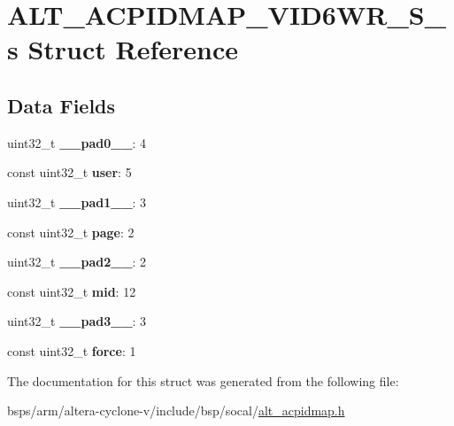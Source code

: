 \hypertarget{structALT__ACPIDMAP__VID6WR__S__s}{}\section{A\+L\+T\+\_\+\+A\+C\+P\+I\+D\+M\+A\+P\+\_\+\+V\+I\+D6\+W\+R\+\_\+\+S\+\_\+s Struct Reference}
\label{structALT__ACPIDMAP__VID6WR__S__s}
\subsection*{Data Fields}
\begin{DoxyCompactItemize}
\item 
\mbox{\label{structALT__ACPIDMAP__VID6WR__S__s_afab267fde5b2c5bf7ffd89e182315f51}} 
uint32\+\_\+t {\bfseries \+\_\+\+\_\+pad0\+\_\+\+\_\+}\+: 4
\item 
\mbox{\label{structALT__ACPIDMAP__VID6WR__S__s_aa2c3d3a2f70354921765c8b9dab77fd8}} 
const uint32\+\_\+t {\bfseries user}\+: 5
\item 
\mbox{\label{structALT__ACPIDMAP__VID6WR__S__s_a72409c911c53802609c1d1eeaebdd679}} 
uint32\+\_\+t {\bfseries \+\_\+\+\_\+pad1\+\_\+\+\_\+}\+: 3
\item 
\mbox{\label{structALT__ACPIDMAP__VID6WR__S__s_a7d7de95e0efbd889ed3995d26557bd08}} 
const uint32\+\_\+t {\bfseries page}\+: 2
\item 
\mbox{\label{structALT__ACPIDMAP__VID6WR__S__s_a3336266330f4afca6c0c679a93951d07}} 
uint32\+\_\+t {\bfseries \+\_\+\+\_\+pad2\+\_\+\+\_\+}\+: 2
\item 
\mbox{\label{structALT__ACPIDMAP__VID6WR__S__s_a568b756c667a152fdb4daf9c3b988a16}} 
const uint32\+\_\+t {\bfseries mid}\+: 12
\item 
\mbox{\label{structALT__ACPIDMAP__VID6WR__S__s_a9a601c68b4aad18ff399b38c64d64532}} 
uint32\+\_\+t {\bfseries \+\_\+\+\_\+pad3\+\_\+\+\_\+}\+: 3
\item 
\mbox{\label{structALT__ACPIDMAP__VID6WR__S__s_aed371f55d8bf9a078a1ee0b26f77bde8}} 
const uint32\+\_\+t {\bfseries force}\+: 1
\end{DoxyCompactItemize}


The documentation for this struct was generated from the following file\+:\begin{DoxyCompactItemize}
\item 
bsps/arm/altera-\/cyclone-\/v/include/bsp/socal/\mbox{\hyperlink{alt__acpidmap_8h}{alt\+\_\+acpidmap.\+h}}\end{DoxyCompactItemize}
